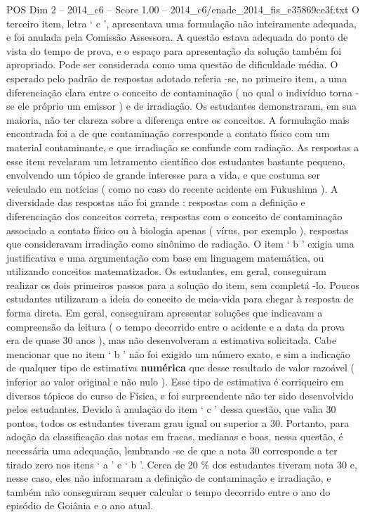 \begin{textsample}{POS Dim 2 – 2014\_c6 – Score 1.00 – 2014\_c6/enade\_2014\_fis\_e35869ce3f.txt}
O terceiro item, letra ‘ c ’, apresentava uma formulação não inteiramente adequada, e foi anulada pela Comissão Assessora.
A questão estava adequada do ponto de vista do tempo de prova, e o espaço para apresentação da solução também foi apropriado.
Pode ser considerada como uma questão de dificuldade média.
O esperado pelo padrão de respostas adotado referia -se, no primeiro item, a uma diferenciação clara entre o conceito de contaminação ( no qual o indivíduo torna -se ele próprio um emissor ) e de irradiação.
Os estudantes demonstraram, em sua maioria, não ter clareza sobre a diferença entre os conceitos.
A formulação mais encontrada foi a de que contaminação corresponde a contato físico com um material contaminante, e que irradiação se confunde com radiação.
As respostas a esse item revelaram um letramento científico dos estudantes bastante pequeno, envolvendo um tópico de grande interesse para a vida, e que costuma ser veiculado em notícias ( como no caso do recente acidente em Fukushima ).
A diversidade das respostas não foi grande : respostas com a definição e diferenciação dos conceitos correta, respostas com o conceito de contaminação associado a contato físico ou à biologia apenas ( vírus, por exemplo ), respostas que consideravam irradiação como sinônimo de radiação.
O item ‘ b ’ exigia uma justificativa e uma argumentação com base em linguagem matemática, ou utilizando conceitos matematizados.
Os estudantes, em geral, conseguiram realizar os dois primeiros passos para a solução do item, sem completá -lo.
Poucos estudantes utilizaram a ideia do conceito de meia-vida para chegar à resposta de forma direta.
Em geral, conseguiram apresentar soluções que indicavam a compreensão da leitura ( o tempo decorrido entre o acidente e a data da prova era de quase 30 anos ), mas não desenvolveram a estimativa solicitada.
Cabe mencionar que no item ‘ b ’ não foi exigido um número exato, e sim a indicação de qualquer tipo de estimativa \textbf{numérica} que desse resultado de valor razoável ( inferior ao valor original e não nulo ).
Esse tipo de estimativa é corriqueiro em diversos tópicos do curso de Física, e foi surpreendente não ter sido desenvolvido pelos estudantes.
Devido à anulação do item ‘ c ’ dessa questão, que valia 30 pontos, todos os estudantes tiveram grau igual ou superior a 30.
Portanto, para adoção da classificação das notas em fracas, medianas e boas, nessa questão, é necessária uma adequação, lembrando -se de que a nota 30 corresponde a ter tirado zero nos itens ‘ a ’ e ‘ b ’.
Cerca de 20 \% dos estudantes tiveram nota 30 e, nesse caso, eles não informaram a definição de contaminação e irradiação, e também não conseguiram sequer calcular o tempo decorrido entre o ano do episódio de Goiânia e o ano atual.

\end{textsample}
